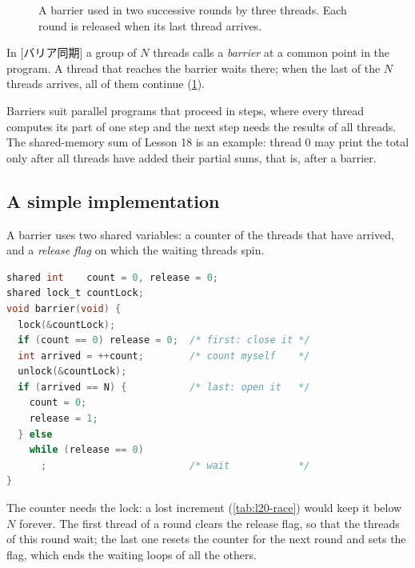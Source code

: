 \documentclass[../main.tex]{subfiles}
\begin{document}
\begin{figure}[htbp]
  \centering
  
  \caption{A barrier used in two successive rounds by three threads.  Each
    round is released when its last thread arrives.}
  \label{fig:l20-barrier}
\end{figure}

\begin{definition}
  In [バリア同期] a group of $N$ threads calls
  a \emph{barrier} at a common point in the program.  A thread that reaches
  the barrier waits there; when the last of the $N$ threads arrives, all of
  them continue (\cref{fig:l20-barrier}).
\end{definition}

Barriers suit parallel programs that proceed in steps, where every thread
computes its part of one step and the next step needs the results of all
threads.  The shared-memory sum of Lesson 18 is an example: thread 0 may
print the total only after all threads have added their partial sums, that
is, after a barrier.

\subsection{A simple implementation}

A barrier uses two shared variables: a counter of the threads that have
arrived, and a \emph{release flag} on which the waiting threads
spin.
\begin{lstlisting}[language=C, numbers=none, morekeywords={shared}]
shared int    count = 0, release = 0;
shared lock_t countLock;
void barrier(void) {
  lock(&countLock);
  if (count == 0) release = 0;  /* first: close it */
  int arrived = ++count;        /* count myself    */
  unlock(&countLock);
  if (arrived == N) {           /* last: open it   */
    count = 0;
    release = 1;
  } else
    while (release == 0)
      ;                         /* wait            */
}
\end{lstlisting}
The counter needs the lock: a lost increment (\cref{tab:l20-race}) would
keep it below $N$ forever.  The first thread of a round clears the release
flag, so that the threads of this round wait; the last one resets the
counter for the next round and sets the flag, which ends the waiting loops
of all the others.
\end{document}
